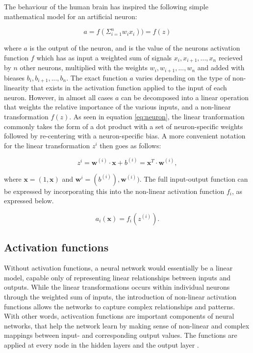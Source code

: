 \documentclass[a4paper, UKenglish, 11pt]{uiomaster}
\begin{document}
The behaviour of the human brain has inspired the following simple mathematical model for an artificial neuron:

\begin{equation}
  a = f \left( \Sigma_{i=1}^n w_ix_i \right) ) = f(z)
\label{eq:neuron}
\end{equation}

where $a$ is the output of the neuron, and is the value of the neurons activation function $f$ which has as input a weighted sum of signals $x_i, x_{i+1},...,x_n$ recieved by $n$ other neurons, multiplied with the weights $w_i, w_{i+1}, ..., w_{n}$ and added with bieases $b_i, b_{i+1}, ..., b_{n}$. The exact function $a$ varies depending on the type of non-linearity that exists in the activation function applied to the input of each neuron. However, in almost all cases $a$ can be decomposed into a linear operation that weights the relative importance of the various inputs, and a non-linear transformation $f(z)$. As seen in equation \ref{eq:neuron}, the linear tranformation commonly takes the form of a dot product with a set of neuron-specific weights followed by re-centering with a neuron-specific bias. A more convenient notation for the linear transformation $z^{i}$ then goes as follows:

\begin{equation}
z^{i} = \boldsymbol{w}^{(i)} \cdot \boldsymbol{x} + b^{(i)} = \mathbf{x}^T \cdot \mathbf{w}^{(i)} ,
\label{eq:linear_transformation}
\end{equation}

where $\mathbf{x} = (1, \boldsymbol{x})$ and $\mathbf{w}^i = (b^{(i)}), \boldsymbol{w}^{(i)})$. The full input-output function can be expressed by incorporating this into the non-linear activation function $f_i$, as expressed below.

\begin{equation}
a_i(\mathbf{x}) = f_i(z^{(i)}) .
\label{eq:linear_transformation}
\end{equation}


\subsection{Activation functions}
Without activation functions, a neural network would essentially be a linear model, capable only of representing linear relationships between inputs and outputs. While the linear transformations occurs within individual neurons through the weighted sum of inputs, the introduction of non-linear activation functions allows the networks to capture complex relationships and patterns. With other words, activcation functions are important components of neural networks, that help the network learn by making sense of non-linear and complex mappings between input- and corresponding output values. The functions are applied at every node in the hidden layers and the output layer \cite{choose_activation_function}.
\end{document}
